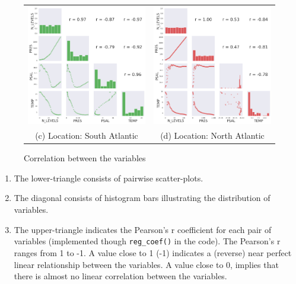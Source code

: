 \documentclass[12pt]{article}
\begin{document}
\begin{figure}[!ht]
\begin{tabular}{cc}
        \hspace{-30pt} \includegraphics[width=70mm]{correlation3.png} &\hspace{10pt}   \includegraphics[width=70mm]{correlation4.png} \\
        (c) Location: South Atlantic & (d) Location: North Atlantic \\[15pt]
        \end{tabular}
        \caption{Correlation between the variables}
        \label{corr}
\end{figure}

\begin{enumerate}
    \item The lower-triangle consists of pairwise scatter-plots.
    \item The diagonal consists of histogram bars illustrating 
    the distribution of variables.
    \item The upper-triangle indicates the Pearson's r 
    coefficient for each pair of variables 
    (implemented though \verb|reg_coef()| 
    in the code). The Pearson's r ranges from 1 to -1.
    A value close to 1 (-1) indicates a (reverse) near
    perfect linear relationship between the variables.
    A value close to 0, implies that there is almost no 
    linear correlation between the variables.
\end{enumerate}
\end{document}
